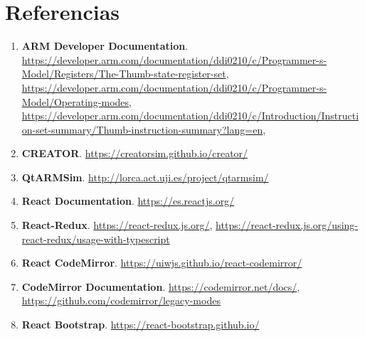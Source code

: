 \newpage
\section{Referencias}
{
    \begin{enumerate}
        \item \textbf{ARM Developer Documentation}. \href{https://developer.arm.com/documentation/ddi0210/c/Programmer-s-Model/Registers/The-Thumb-state-register-set}{https://developer.arm.com/documentation/ddi0210/c/Programmer-s-Model/Registers/The-Thumb-state-register-set}, 
            \href{https://developer.arm.com/documentation/ddi0210/c/Programmer-s-Model/Operating-modes}{https://developer.arm.com/documentation/ddi0210/c/Programmer-s-Model/Operating-modes}, \href{https://developer.arm.com/documentation/ddi0210/c/Introduction/Instruction-set-summary/Thumb-instruction-summary?lang=en}{https://developer.arm.com/documentation/ddi0210/c/Introduction/Instruction-set-summary/Thumb-instruction-summary?lang=en},
        \item \textbf{CREATOR}. \href{https://creatorsim.github.io/creator/}{https://creatorsim.github.io/creator/}
        \item \textbf{QtARMSim}. \href{http://lorca.act.uji.es/project/qtarmsim/}{http://lorca.act.uji.es/project/qtarmsim/}
        \item \textbf{React Documentation}. \href{https://es.reactjs.org/}{https://es.reactjs.org/}
        \item \textbf{React-Redux}. \href{https://react-redux.js.org/}{https://react-redux.js.org/}, \href{https://react-redux.js.org/using-react-redux/usage-with-typescript}{https://react-redux.js.org/using-react-redux/usage-with-typescript}
        \item \textbf{React CodeMirror}. \href{https://uiwjs.github.io/react-codemirror/}{https://uiwjs.github.io/react-codemirror/}
        \item \textbf{CodeMirror Documentation}. \href{https://codemirror.net/docs/}{https://codemirror.net/docs/}, \href{https://github.com/codemirror/legacy-modes}{https://github.com/codemirror/legacy-modes}
        \item \textbf{React Bootstrap}. \href{https://react-bootstrap.github.io/}{https://react-bootstrap.github.io/}
    \end{enumerate}
}

